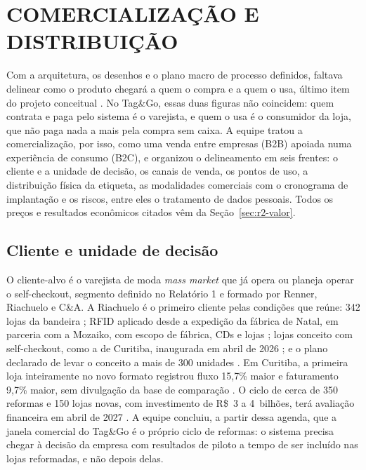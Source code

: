 
\section{COMERCIALIZAÇÃO E DISTRIBUIÇÃO}
\label{sec:r2-comercializacao}

Com a arquitetura, os desenhos e o plano macro de processo definidos, faltava delinear como o produto chegará a quem o compra e a quem o usa, último item do projeto conceitual \cite{zancul2026conceitual}. No Tag\&Go, essas duas figuras não coincidem: quem contrata e paga pelo sistema é o varejista, e quem o usa é o consumidor da loja, que não paga nada a mais pela compra sem caixa. A equipe tratou a comercialização, por isso, como uma venda entre empresas (B2B) apoiada numa experiência de consumo (B2C), e organizou o delineamento em seis frentes: o cliente e a unidade de decisão, os canais de venda, os pontos de uso, a distribuição física da etiqueta, as modalidades comerciais com o cronograma de implantação e os riscos, entre eles o tratamento de dados pessoais. Todos os preços e resultados econômicos citados vêm da Seção~\ref{sec:r2-valor}.

\subsection{Cliente e unidade de decisão}
\label{sub:r2-cliente}

O cliente-alvo é o varejista de moda \textit{mass market} que já opera ou planeja operar o self-checkout, segmento definido no Relatório 1 e formado por Renner, Riachuelo e C\&A. A Riachuelo é o primeiro cliente pelas condições que reúne: 342 lojas da bandeira \cite{abvtex2026riachuelo}; RFID aplicado desde a expedição da fábrica de Natal, em parceria com a Mozaiko, com escopo de fábrica, CDs e lojas \cite{tiinside2022riachuelo}; lojas conceito com self-checkout, como a de Curitiba, inaugurada em abril de 2026 \cite{amanha2026riachuelo}; e o plano declarado de levar o conceito a mais de 300 unidades \cite{mercadoconsumo2026riachuelo}. Em Curitiba, a primeira loja inteiramente no novo formato registrou fluxo 15,7\% maior e faturamento 9,7\% maior, sem divulgação da base de comparação \cite{curitibainforma2026riachuelo}. O ciclo de cerca de 350 reformas e 150 lojas novas, com investimento de R\$~3 a 4~bilhões, terá avaliação financeira em abril de 2027 \cite{economicnews2026riachuelo}. A equipe concluiu, a partir dessa agenda, que a janela comercial do Tag\&Go é o próprio ciclo de reformas: o sistema precisa chegar à decisão da empresa com resultados de piloto a tempo de ser incluído nas lojas reformadas, e não depois delas.


